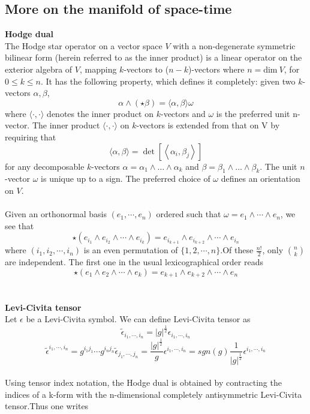 \documentclass{article}
\begin{document}
\subsection{More on the manifold of space-time}
\textbf{Hodge dual}\\
The Hodge star operator on a vector space $V$ with a non-degenerate symmetric bilinear form (herein referred to as the inner product) is a linear operator on the exterior algebra of $V$, mapping $k$-vectors to ($n-k$)-vectors where $n = \text{dim} \ V$, for $ 0 \leq k \leq n$. It has the following property, which defines it completely: given two $k$-vectors $\alpha,\beta$,
\[\alpha \wedge (\star \beta )=\langle \alpha ,\beta \rangle \omega\]
where $\langle \cdot ,\cdot \rangle$ denotes the inner product on $k$-vectors and $\omega$ is the preferred unit n-vector.
The inner product $\langle \cdot ,\cdot \rangle$ on $k$-vectors is extended from that on V by requiring that
\[\langle \alpha ,\beta \rangle =\det \left[\left\langle \alpha _{i},\beta _{j}\right\rangle \right]\]
for any decomposable $k$-vectors $\alpha =\alpha _{1}\wedge \dots \wedge \alpha _{k}$ and $\beta =\beta _{1}\wedge \dots \wedge \beta _{k}$. The unit $n$-vector $\omega$ is unique up to a sign. The preferred choice of $\omega$ defines an orientation on $V$.\\ \\
Given an orthonormal basis $(e_{1},\cdots ,e_{n})$ ordered such that $\omega =e_{1}\wedge \cdots \wedge e_{n}$, we see that
\[\star (e_{i_{1}}\wedge e_{i_{2}}\wedge \cdots \wedge e_{i_{k}})=e_{i_{k+1}}\wedge e_{i_{k+2}}\wedge \cdots \wedge e_{i_{n}}\]
where $(i_{1},i_{2},\cdots ,i_{n})$ is an even permutation of $\{1,2,\cdots,n\}$.Of these $\frac{n!}{2}$, only $n \choose k$ are independent. The first one in the usual lexicographical order reads
\[\star (e_{1}\wedge e_{2}\wedge \cdots \wedge e_{k})=e_{k+1}\wedge e_{k+2}\wedge \cdots \wedge e_{n}\]\\ \\
\textbf{Levi-Civita tensor}\\
Let $\epsilon$ be a Levi-Civita symbol. We can define Levi-Civita tensor as 
\[\tilde{\epsilon}_{i_1,\cdots,i_n} = |g|^{\frac{1}{2}} \epsilon_{i_1,\cdots,i_n}\]
\[\tilde{\epsilon}^{i_1,\cdots,i_n} = g^{i_1j_1} \cdots g^{i_nj_n} \tilde{\epsilon}_{j_1,\cdots,j_n} = \frac{|g|^{\frac{1}{2}}}{g} \epsilon^{i_1,\cdots,i_n} = sgn(g) \frac{1}{|g|^{\frac{1}{2}}} \epsilon^{i_1,\cdots,i_n}\]\\
Using tensor index notation, the Hodge dual is obtained by contracting the indices of a k-form with the n-dimensional completely antisymmetric Levi-Civita tensor.Thus one writes
\end{document}
